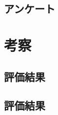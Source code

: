 \documentclass{funthesis}
\begin{document}


\section{アンケート}





\chapter{考察}

\section{評価結果}


\section{評価結果}
\end{document}
